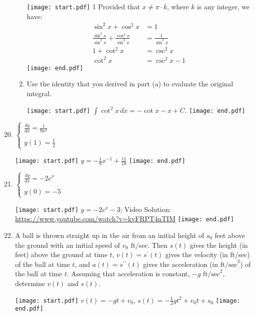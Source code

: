 \documentclass[12pt]{article}
\begin{document}
\begin{enumerate}
\begin{enumerate}
\texttt{[image: start.pdf]}
{{{1\linewidth}{ Provided that $x \neq \pi \cdot k$, where $k$ is any integer, we have:
\begin{align*} 
\sin^{2}{x}+\cos^{2}{x} &=1\\
\frac{\sin^{2}{x}}{\sin^{2}{x}}+\frac{\cos^{2}{x}}{\sin^2{x}}&=\frac{1}{\sin^2{x}}\\
1+\cot^2{x}&=\csc^2{x}\\
\cot^2{x}&=\csc^2{x}-1
\end{align*}
}}}
\texttt{[image: end.pdf]}


\item Use the identity that you derived in part (a) to evaluate the original integral.

\texttt{[image: start.pdf]}
{{$\int{\cot^{2}{x}} \,dx=-\cot{x}-x+C$.}}
\texttt{[image: end.pdf]}


\end{enumerate}

\end{enumerate}

\newpage


\begin{enumerate}
\setcounter{enumi}{19}

\item $\left\{\begin{array}{l}
\frac{dy}{dx}=\frac{1}{9x^2}\\
\\
y(1)=\frac{1}{2}
\end{array}\right.$

\texttt{[image: start.pdf]}
{{$y=-\frac{1}{9}x^{-1}+\frac{11}{18}$}}
\texttt{[image: end.pdf]}


\item $\left\{\begin{array}{l}
\frac{dy}{dx}=-2e^{x}\\
\\
y(0)=-5
\end{array}\right.$

\texttt{[image: start.pdf]}
{{$y=-2e^{x}-3$; Video Solution: \textcolor{blue}{\href{https://www.youtube.com/watch?v=kvFRPT4nTIM}{https://www.youtube.com/watch?v=kvFRPT4nTIM}}}}
\texttt{[image: end.pdf]}


\item A ball is thrown straight up in the air from an initial height of $s_0$ feet above the ground with an initial speed of $v_0$ ft/sec.  Then $s(t)$ gives the height (in feet) above the ground at time $t$, $v(t)=s^{\prime}(t)$ gives the velocity (in ft/sec) of the ball at time $t$, and $a(t)=s^{\prime \prime}(t)$ gives the acceleration (in $\text{ft/sec}^2$) of the ball at time $t$.  Assuming that acceleration is constant, $-g \text{ ft/sec}^2$, determine $v(t)$ and $s(t)$.

\texttt{[image: start.pdf]}
{{$v(t)=-gt+v_0$, $s(t)=-\frac{1}{2}gt^2+v_0t+s_0$}}
\texttt{[image: end.pdf]}


\end{enumerate}
\end{document}
